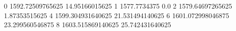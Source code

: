 0 1592.72509765625 14.95166015625
1 1577.7734375 0.0
2 1579.64697265625 1.87353515625
4 1599.304931640625 21.531494140625
6 1601.072998046875 23.299560546875
8 1603.515869140625 25.742431640625
